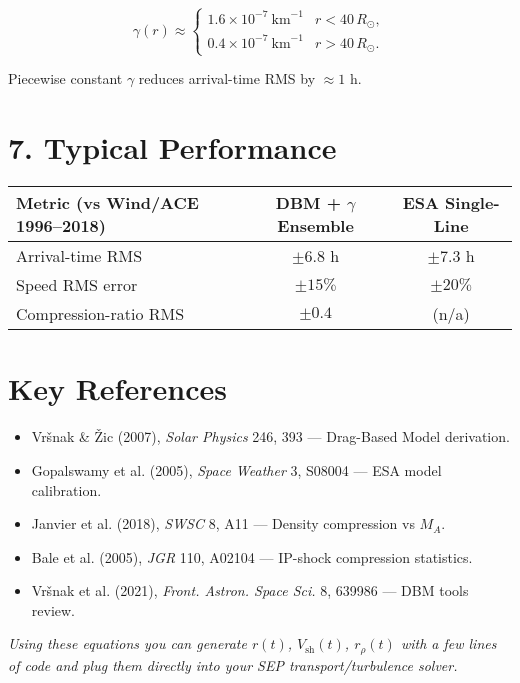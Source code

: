 \[
\gamma(r) \approx
\begin{cases}
1.6 \times 10^{-7}\ \text{km}^{-1} & r < 40\,R_\odot,\\
0.4 \times 10^{-7}\ \text{km}^{-1} & r > 40\,R_\odot.
\end{cases}
\]

Piecewise constant $\gamma$ reduces arrival-time RMS by $\approx 1$ h.

\hrulefill

\section*{7. Typical Performance}

\begin{center}
\begin{tabular}{@{}lcc@{}}
\toprule
\textbf{Metric (vs Wind/ACE 1996–2018)} & \textbf{DBM + $\gamma$ Ensemble} & \textbf{ESA Single-Line} \\
\midrule
Arrival-time RMS & $\pm 6.8$ h & $\pm 7.3$ h \\
Speed RMS error  & $\pm 15\%$  & $\pm 20\%$ \\
Compression-ratio RMS & $\pm 0.4$ & (n/a) \\
\bottomrule
\end{tabular}
\end{center}

\hrulefill

\section*{Key References}

\begin{itemize}
\item Vršnak \& Žic (2007), \textit{Solar Physics} 246, 393 — Drag-Based Model derivation.
\item Gopalswamy et al. (2005), \textit{Space Weather} 3, S08004 — ESA model calibration.
\item Janvier et al. (2018), \textit{SWSC} 8, A11 — Density compression vs $M_A$.
\item Bale et al. (2005), \textit{JGR} 110, A02104 — IP-shock compression statistics.
\item Vršnak et al. (2021), \textit{Front. Astron. Space Sci.} 8, 639986 — DBM tools review.
\end{itemize}

\textit{Using these equations you can generate $r(t)$, $V_{\text{sh}}(t)$, $r_{\rho}(t)$ with a few lines of code and plug them directly into your SEP transport/turbulence solver.}


